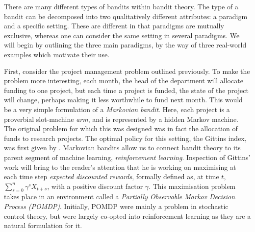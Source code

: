 \par There are many different types of bandits within bandit theory. The type of a bandit can be decomposed into two qualitatively different attributes: a paradigm and a specific setting. These are different in that paradigms are mutually exclusive, whereas one can consider the same setting in several paradigms. We will begin by outlining the three main paradigms, by the way of three real-world examples which motivate their use. 

\par First, consider the project management problem outlined previously. To make the problem more interesting, each month, the head of the department will allocate funding to one project, but each time a project is funded, the state of the project will change, perhaps making it less worthwhile to fund next month. This would be a very simple formulation of a {\em Markovian bandit}. Here, each project is a proverbial slot-machine {\em arm}, and is represented by a hidden Markov machine. The original problem for which this was designed was in fact the allocation of funds to research projects\cite{gittins:1989}. The optimal policy for this setting, the Gittins index, was first given by \citet{gittins:1979}. Markovian bandits allow us to connect bandit theory to its parent segment of machine learning, {\em reinforcement learning}. Inspection of Gittins' work will bring to the reader's attention that he is working on maximising at each time step {\em expected discounted rewards}, formally defined as, at time $t$, $\sum_{s=0}^n\gamma^sX_{t+s}$, with a positive discount factor $\gamma$. This maximisation problem takes place in an environment called a {\em Partially Observable Markov Decision Process (POMDP)}. Initially, POMDP were mainly a problem in stochastic control theory, but were largely co-opted into reinforcement learning as they are a natural formulation\cite{sutton:1998} for it. 

